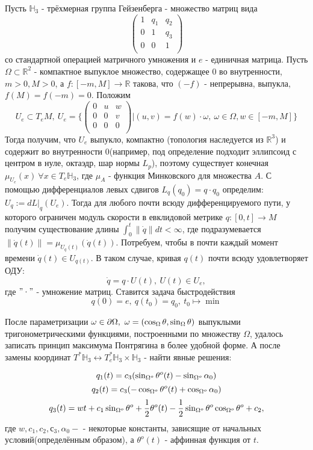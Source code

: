 Пусть \(\mathbb{H}_3\) - трёхмерная группа Гейзенберга - множество матриц вида 
\[\begin{pmatrix}
	1& q_1& q_2\\
	0& 1& q_3\\
	0& 0& 1\\
\end{pmatrix} \] со стандартной операцией матричного умножения и \(e\) - единичная матрица. Пусть \(\Omega \subset \mathbb{R}^2\) - компактное выпуклое множество, содержащее 0 во внутренности, \(m > 0, M > 0\), а \(f: [-m, M] \rightarrow \mathbb{R}\) такова, что \((-f)\) - непрерывна, выпукла, \(f(M) = f(-m) = 0\).  Положим \[U_e \subset T_eM,\ U_e = \{\begin{pmatrix}
	0& u& w\\
	0& 0& v\\
	0& 0& 0\\
\end{pmatrix}| (u, v) = f(w)\cdot\omega,\ \omega\in\Omega, w\in [-m, M] \}\]
Тогда получим, что  \(U_e\) выпукло, компактно (топология наследуется из \(\mathbb{R}^3\)) и содержит во внутренности 0(например, под определение подходит эллипсоид с центром в нуле, октаэдр, шар нормы \(L_p\)), поэтому существует конечная \(\mu_{U_e}(x)\ \forall x \in T_e\mathbb{H}_3\), где \(\mu_A\) - функция Минковского для множества \(A\). С помощью дифференциалов левых сдвигов \(L_q(q_0) = q\cdot q_0\) определим: \(U_q := dL|_q(U_e)\). Тогда для любого почти всюду дифференцируемого пути, у которого ограничен модуль скорости в евклидовой метрике \(q: [0, t] \rightarrow M\) получим существование длины \(\int_0^{t} \|\dot{q}\|dt < \infty\), где подразумевается \(\|\dot{q}(t)\| = \mu_{U_q(t)}(\dot{q}(t))\). Потребуем, чтобы в почти каждый момент времени \(\dot{q}(t) \in U_{q(t)}\). В таком случае, кривая \(q(t)\) почти всюду удовлетворяет ОДУ:
\[\dot{q} = q\cdot U(t),\ U(t) \in U_e,\]
где \("\cdot"\) - умножение матриц. Ставится задача быстродействия \[q(0) = e,\ q(t_0) = q_0,\ t_0\mapsto\min\]

После параметризации \(\omega\in\partial\Omega,\ \omega = (\Ci, \Si)\) выпуклыми тригонометрическими функциями, построенными по множеству \(\Omega\), удалось записать принцип максимума Понтрягина в более удобной форме. А после замены координат \(T^*\mathbb{H}_3 \leftrightarrow T^*_e\mathbb{H}_3\times \mathbb{H}_3\) - найти явные решения:

\[q_1(t) = c_3(\So[\theta^o(t)] - \So[\alpha_0])\]
\[q_2(t) = c_3( -\Co[\theta^o(t)] + \Co[\alpha_0])\]
\[q_3(t) = wt + c_1\So + \frac{1}{2}\theta^o(t) - \frac{1}{2}\So\Co + c_2,\]
где \(w, c_1, c_2, с_3, \alpha_0 -\) - некоторые константы, зависящие от начальных условий(определённым образом), а \(\theta^o(t)\) - аффинная функция от \(t\).

